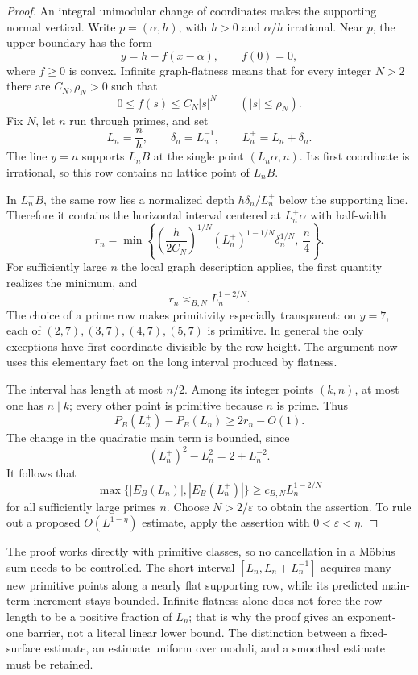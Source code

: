 \begin{proof}
An integral unimodular change of coordinates makes the supporting normal
vertical. Write $p=(\alpha,h)$, with $h>0$ and $\alpha/h$ irrational.
Near $p$, the upper boundary has the form
\[
 y=h-f(x-\alpha),\qquad f(0)=0,
\]
where $f\geq0$ is convex. Infinite graph-flatness means that for every
integer $N>2$ there are $C_N,\rho_N>0$ such that
\[
 0\leq f(s)\leq C_N|s|^N\qquad (|s|\leq\rho_N).
\]
Fix $N$, let $n$ run through primes, and set
\[
 L_n=\frac nh,\qquad \delta_n=L_n^{-1},\qquad L_n^+=L_n+\delta_n.
\]
The line $y=n$ supports $L_nB$ at the single point
$(L_n\alpha,n)$. Its first coordinate is irrational, so this row
contains no lattice point of $L_nB$.

In $L_n^+B$, the same row lies a normalized depth
$h\delta_n/L_n^+$ below the supporting line. Therefore it contains the
horizontal interval centered at $L_n^+\alpha$ with half-width
\[
 r_n=\min\left\{
 \left(\frac h{2C_N}\right)^{1/N}
 (L_n^+)^{1-1/N}\delta_n^{1/N},\ \frac n4
 \right\}.
\]
For sufficiently large $n$ the local graph description applies, the
first quantity realizes the minimum, and
\[
 r_n\asymp_{B,N}L_n^{1-2/N}.
\]
The choice of a prime row makes primitivity especially transparent:
on $y=7$, each of $(2,7),(3,7),(4,7),(5,7)$ is primitive.
In general the only exceptions have first coordinate divisible by
the row height. The argument now uses this elementary fact on the
long interval produced by flatness.

The interval has length at most $n/2$. Among its integer points
$(k,n)$, at most one has $n\mid k$; every other point is primitive
because $n$ is prime. Thus
\[
 P_B(L_n^+)-P_B(L_n)\geq 2r_n-O(1).
\]
The change in the quadratic main term is bounded, since
\[
 (L_n^+)^2-L_n^2=2+L_n^{-2}.
\]
It follows that
\[
 \max\{|E_B(L_n)|,|E_B(L_n^+)|\}
 \geq c_{B,N}L_n^{1-2/N}
\]
for all sufficiently large primes $n$. Choose $N>2/\varepsilon$ to
obtain the assertion. To rule out a proposed $O(L^{1-\eta})$ estimate,
apply the assertion with $0<\varepsilon<\eta$.
\end{proof}

The proof works directly with primitive classes, so no cancellation in a
M\"obius sum needs to be controlled. The short interval
$[L_n,L_n+L_n^{-1}]$ acquires many new primitive points along a nearly
flat supporting row, while its predicted main-term increment stays
bounded. Infinite flatness alone does not force the row length to be a
positive fraction of $L_n$; that is why the proof gives an exponent-one
barrier, not a literal linear lower bound. The distinction between a
fixed-surface estimate, an estimate uniform over moduli, and a smoothed
estimate must be retained.

